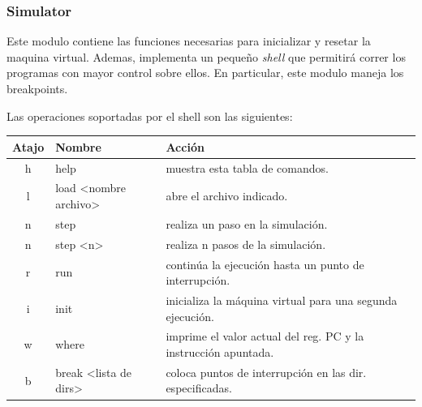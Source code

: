\documentclass[12pt]{article}
\begin{document}
\subsubsection{Simulator}

Este modulo contiene las funciones necesarias para inicializar y resetar la maquina virtual. Ademas, implementa un pequeño \textit{shell} que permitirá correr los programas con mayor control sobre ellos. En particular, este modulo maneja los breakpoints. 

Las operaciones soportadas por el shell  son las siguientes:

\begin{table}[H]
\hskip-2.0cm
\begin{tabular}{@{}cll@{}}
\toprule
\multicolumn{1}{c}{Atajo} & Nombre                                                       & Acción                                                                        \\ \midrule
h                         & help                                                         & muestra esta tabla de comandos.                                               \\
l                         & load \textless nombre archivo\textgreater                  & abre el archivo indicado.                                                     \\
n                         & step                                                         & realiza un paso en la simulación.                                             \\
n                         & step \textless n\textgreater                                  & realiza n pasos de la simulación.                                             \\
r                         & run                                                          & continúa la ejecución hasta un punto de interrupción.                         \\
i                         & init                                                         & inicializa la máquina virtual para una segunda ejecución.                     \\
w                         & where                                                        & imprime el valor actual del reg. PC y la instrucción apuntada.    \\
b                         & break \textless lista de dirs\textgreater              & coloca puntos de interrupción en las dir. especificadas.               \\

\end{tabular}
\end{table}
\end{document}
